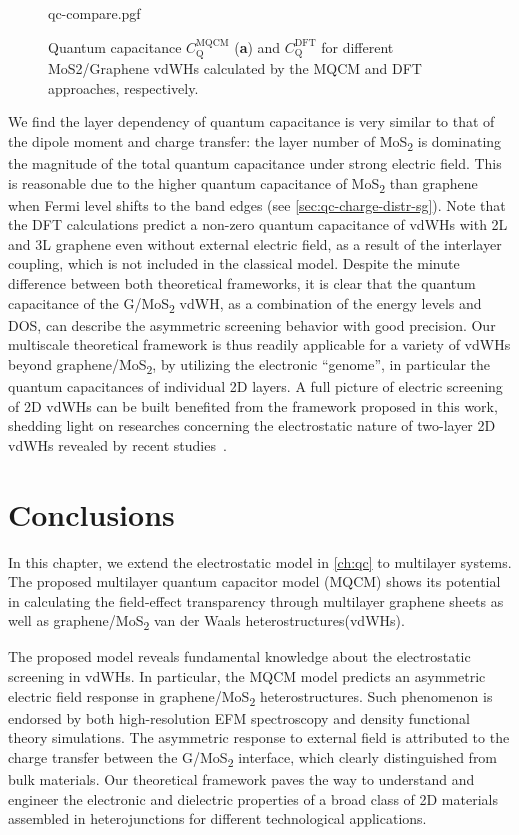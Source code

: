 \begin{figure}[!htbp]
  {qc-compare.pgf}
  \caption{\label{fig:asym-qc} %
    Quantum capacitance $C_{\mathrm{Q}}^{\mathrm{MQCM}}$ (\textbf{a}) and $C_{\mathrm{Q}}^{\mathrm{DFT}}$ for different MoS2/Graphene
    vdWHs calculated by the MQCM and DFT approaches, respectively.
  }
\end{figure}
%
We find the layer dependency of quantum capacitance is very
similar to that of the dipole moment and charge transfer: the layer
number of MoS\textsubscript{2} is dominating the magnitude of the
total quantum capacitance under strong electric field. This is
reasonable due to the higher quantum capacitance of
MoS\textsubscript{2} than graphene when Fermi level shifts to the band
edges (see \autoref{sec:qc-charge-distr-sg}).
%
Note that the DFT calculations predict a non-zero quantum capacitance
of vdWHs with 2L and 3L graphene even without external electric field,
as a result of the interlayer coupling, which is not included in the
classical model. Despite the minute difference between both
theoretical frameworks, it is clear that the quantum capacitance of
the G/MoS\textsubscript{2} vdWH, as a combination of the energy levels
and DOS, can describe the asymmetric screening behavior with good
precision. Our multiscale theoretical framework is thus readily
applicable for a variety of vdWHs beyond
graphene/MoS\textsubscript{2}, by utilizing the electronic “genome”,
in particular the quantum capacitances of individual 2D layers. A full
picture of electric screening of 2D vdWHs can be built benefited from
the framework proposed in this work, shedding light on researches
concerning the electrostatic nature of two-layer 2D vdWHs revealed by
recent
studies~\autocite{Chu_2017_eh_tunneling,Lee_2014_pn_vdw_het,Furchi_2014_PV_vdwH}.

\section{Conclusions}
\label{sec:asym-conclusions}


In this chapter, we extend the electrostatic model in \autoref{ch:qc}
to multilayer systems. The proposed multilayer quantum capacitor model
(MQCM) shows its potential in calculating the field-effect
transparency through multilayer graphene sheets as well as
graphene/MoS\textsubscript{2} van der Waals heterostructures(vdWHs). 

The proposed model reveals fundamental knowledge about the
electrostatic screening in vdWHs.
In particular, the MQCM model predicts an
asymmetric electric field response in
graphene/MoS\textsubscript{2} heterostructures. Such phenomenon is endorsed by
both high-resolution EFM spectroscopy
and density functional theory simulations.
%
The asymmetric response to external field is attributed to the charge transfer between the G/MoS\textsubscript{2} interface, which clearly distinguished from bulk materials.
%
Our theoretical framework paves the way to
understand and engineer the electronic and dielectric properties of a
broad class of 2D materials assembled in heterojunctions for different
technological applications.

